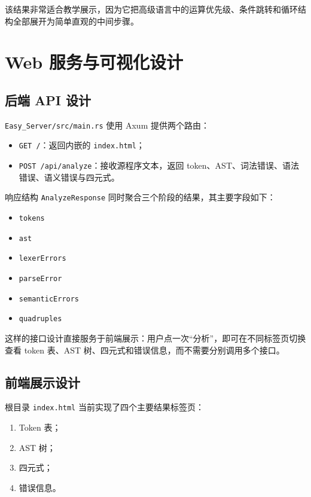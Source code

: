 \documentclass[UTF8,a4paper,12pt]{ctexart}
\newcommand{\pkg}[1]{\texttt{#1}}
\begin{document}
该结果非常适合教学展示，因为它把高级语言中的运算优先级、条件跳转和循环结构全部展开为简单直观的中间步骤。

\section{Web 服务与可视化设计}

\subsection{后端 API 设计}

\pkg{Easy\_Server/src/main.rs} 使用 Axum 提供两个路由：

\begin{itemize}
    \item \pkg{GET /}：返回内嵌的 \pkg{index.html}；
    \item \pkg{POST /api/analyze}：接收源程序文本，返回 token、AST、词法错误、语法错误、语义错误与四元式。
\end{itemize}

响应结构 \pkg{AnalyzeResponse} 同时聚合三个阶段的结果，其主要字段如下：

\begin{itemize}
    \item \pkg{tokens}
    \item \pkg{ast}
    \item \pkg{lexerErrors}
    \item \pkg{parseError}
    \item \pkg{semanticErrors}
    \item \pkg{quadruples}
\end{itemize}

这样的接口设计直接服务于前端展示：用户点一次“分析”，即可在不同标签页切换查看 token 表、AST 树、四元式和错误信息，而不需要分别调用多个接口。

\subsection{前端展示设计}

根目录 \pkg{index.html} 当前实现了四个主要结果标签页：

\begin{enumerate}[label=\arabic*.]
    \item Token 表；
    \item AST 树；
    \item 四元式；
    \item 错误信息。
\end{enumerate}
\end{document}

